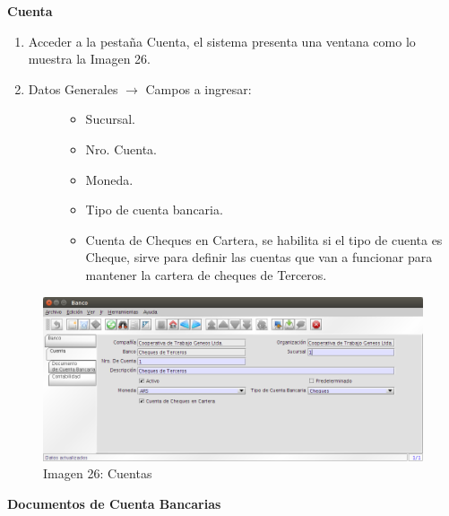 \documentclass[letterpaper,10pt,spanish]{sphinxmanual}
\begin{document}
\textbf{Cuenta}
\begin{enumerate}
\item {} 
Acceder a la pestaña Cuenta, el sistema presenta una ventana como lo muestra la Imagen 26.

\item {} \begin{description}
\item[{Datos Generales \(\rightarrow\) Campos a ingresar:}] \leavevmode\begin{itemize}
\item {} 
Sucursal.

\item {} 
Nro. Cuenta.

\item {} 
Moneda.

\item {} 
Tipo de cuenta bancaria.

\item {} 
Cuenta de Cheques en Cartera, se habilita si el tipo de cuenta es Cheque, sirve para definir las cuentas que van a funcionar para mantener la cartera de cheques de Terceros.

\end{itemize}

\end{description}

\end{enumerate}
\begin{figure}[htbp]
\centering
\capstart

\includegraphics{ly_bancos_26.png}
\caption{Imagen 26: Cuentas}\end{figure}

\textbf{Documentos de Cuenta Bancarias}
\end{document}

